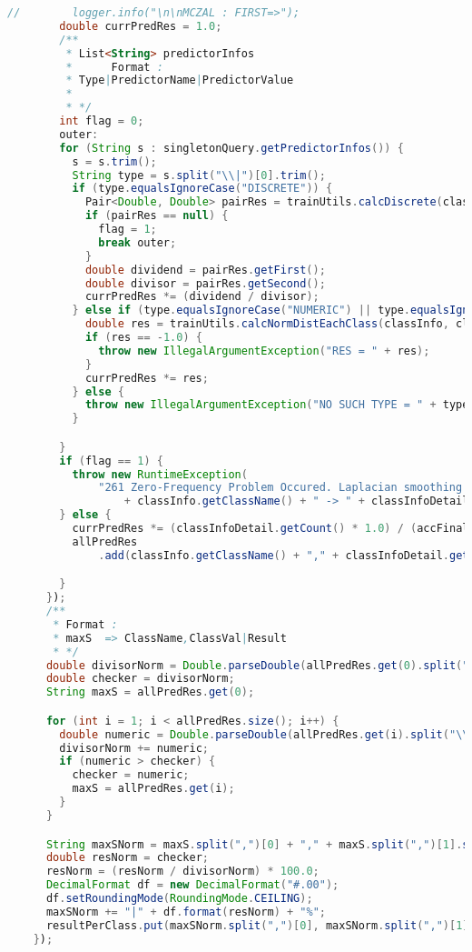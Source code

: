 \begin{lstlisting}[language=Java,basicstyle=\tiny,caption=TestingController.java]
        //        logger.info("\n\nMCZAL : FIRST=>");
        double currPredRes = 1.0;
        /**
         * List<String> predictorInfos
         *      Format :
         * Type|PredictorName|PredictorValue
         *
         * */
        int flag = 0;
        outer:
        for (String s : singletonQuery.getPredictorInfos()) {
          s = s.trim();
          String type = s.split("\\|")[0].trim();
          if (type.equalsIgnoreCase("DISCRETE")) {
            Pair<Double, Double> pairRes = trainUtils.calcDiscrete(classInfo, classInfoDetail, s);
            if (pairRes == null) {
              flag = 1;
              break outer;
            }
            double dividend = pairRes.getFirst();
            double divisor = pairRes.getSecond();
            currPredRes *= (dividend / divisor);
          } else if (type.equalsIgnoreCase("NUMERIC") || type.equalsIgnoreCase("NUMERICAL")) {
            double res = trainUtils.calcNormDistEachClass(classInfo, classInfoDetail, s);
            if (res == -1.0) {
              throw new IllegalArgumentException("RES = " + res);
            }
            currPredRes *= res;
          } else {
            throw new IllegalArgumentException("NO SUCH TYPE = " + type);
          }

        }
        if (flag == 1) {
          throw new RuntimeException(
              "261 Zero-Frequency Problem Occured. Laplacian smoothing didn't work for: \n"
                  + classInfo.getClassName() + " -> " + classInfoDetail.getValue());
        } else {
          currPredRes *= (classInfoDetail.getCount() * 1.0) / (accFinal * 1.0);
          allPredRes
              .add(classInfo.getClassName() + "," + classInfoDetail.getValue() + "|" + currPredRes);

        }
      });
      /**
       * Format :
       * maxS  => ClassName,ClassVal|Result
       * */
      double divisorNorm = Double.parseDouble(allPredRes.get(0).split("\\|")[1]);
      double checker = divisorNorm;
      String maxS = allPredRes.get(0);

      for (int i = 1; i < allPredRes.size(); i++) {
        double numeric = Double.parseDouble(allPredRes.get(i).split("\\|")[1]);
        divisorNorm += numeric;
        if (numeric > checker) {
          checker = numeric;
          maxS = allPredRes.get(i);
        }
      }

      String maxSNorm = maxS.split(",")[0] + "," + maxS.split(",")[1].split("\\|")[0];
      double resNorm = checker;
      resNorm = (resNorm / divisorNorm) * 100.0;
      DecimalFormat df = new DecimalFormat("#.00");
      df.setRoundingMode(RoundingMode.CEILING);
      maxSNorm += "|" + df.format(resNorm) + "%";
      resultPerClass.put(maxSNorm.split(",")[0], maxSNorm.split(",")[1]);
    });


\end{lstlisting}
